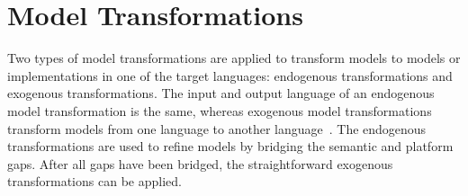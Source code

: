 \section{Model Transformations}
\label{sec:slco:model-transformations}
Two types of model transformations are applied to transform \SLCO models to models or implementations in one of the target languages: endogenous transformations and exogenous transformations.
The input and output language of an endogenous model transformation is the same, whereas exogenous model transformations transform models from one language to another language~\cite{Mens:2006:TMT:1706639.1706924}.
The endogenous transformations are used to refine \SLCO models by bridging the semantic and platform gaps.
After all gaps have been bridged, the straightforward exogenous transformations can be applied.



 
